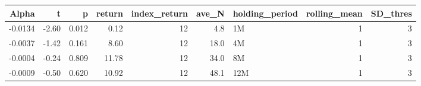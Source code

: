 \begin{table}[ht]
\centering
\begin{tabular}{rrrrrrlrr}
  \hline
Alpha & t & p & return & index\_return & ave\_N & holding\_period & rolling\_mean & SD\_thres \\ 
  \hline
-0.0134 & -2.60 & 0.012 & 0.12 & 12 & 4.8 & 1M &  1 &  3 \\ 
  -0.0037 & -1.42 & 0.161 & 8.60 & 12 & 18.0 & 4M &  1 &  3 \\ 
  -0.0004 & -0.24 & 0.809 & 11.78 & 12 & 34.0 & 8M &  1 &  3 \\ 
  -0.0009 & -0.50 & 0.620 & 10.92 & 12 & 48.1 & 12M &  1 &  3 \\ 
   \hline
\end{tabular}
\end{table}

